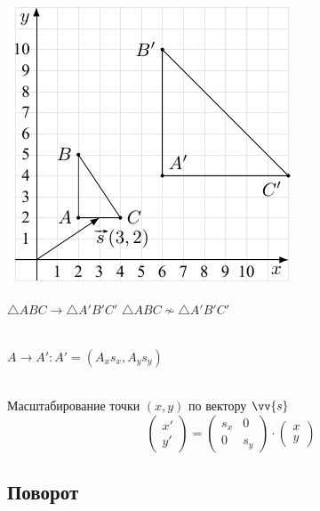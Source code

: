 \documentclass[10pt]{beamer}
\begin{document}
    {
    	{
    		\centering
    		\includegraphics[]{scale2.pdf}
    		
    		
    	}
    	{
    		$\triangle ABC \rightarrow \triangle A'B'C' $ 
    		$\triangle ABC \nsim \triangle A'B'C' $ \\ ~ \\
    		
    		\pause
    		
    		$A \rightarrow A' : A'=(A_xs_x, A_ys_y) $ \\ ~ \\
    		
    		\pause
    		
    		\begin{block}{Масштабирование точки $(x,y)$ по вектору $\vv{s}$ }
    			 $$  
    			\begin{pmatrix}
    				x' \\ y'
    			\end{pmatrix}   
    			=    		
    			\begin{pmatrix}
    				s_x & 0 \\
    				0   & s_y  
    			\end{pmatrix} 
    			\cdot     
    			\begin{pmatrix}
    				x \\ y
    			\end{pmatrix} 		   
    			$$
    		\end{block}    		
    		
    		
    	}
    	
    }
    
    
    \subsection{Поворот}
    
\end{document}
